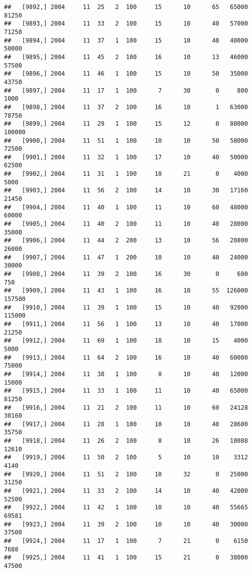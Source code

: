 \documentclass{article}\usepackage[]{graphicx}\usepackage[]{color}
\makeatletter
\newenvironment{kframe}{%
 \def\at@end@of@kframe{}%
 \ifinner\ifhmode%
  \def\at@end@of@kframe{\end{minipage}}%
  \begin{minipage}{\columnwidth}%
 \fi\fi%
 \def\FrameCommand##1{\hskip\@totalleftmargin \hskip-\fboxsep
 \colorbox{shadecolor}{##1}\hskip-\fboxsep
     \hskip-\linewidth \hskip-\@totalleftmargin \hskip\columnwidth}%
 \MakeFramed {\advance\hsize-\width
   \@totalleftmargin\z@ \linewidth\hsize
   \@setminipage}}%
 {\par\unskip\endMakeFramed%
 \at@end@of@kframe}
\newenvironment{knitrout}{}{} %
\makeatother
\begin{document}
\begin{knitrout}
\begin{kframe}
\begin{verbatim}
##   [9892,] 2004     11  25   2  100     15      10      65   65000   81250
##   [9893,] 2004     11  33   2  100     15      10      40   57000   71250
##   [9894,] 2004     11  37   1  100     15      10      40   40000   50000
##   [9895,] 2004     11  45   2  100     16      10      13   46000   57500
##   [9896,] 2004     11  46   1  100     15      10      50   35000   43750
##   [9897,] 2004     11  17   1  100      7      30       0     800    1000
##   [9898,] 2004     11  37   2  100     16      10       1   63000   78750
##   [9899,] 2004     11  29   1  100     15      12       0   80000  100000
##   [9900,] 2004     11  51   1  100     10      10      50   58000   72500
##   [9901,] 2004     11  32   1  100     17      10      40   50000   62500
##   [9902,] 2004     11  31   1  100     10      21       0    4000    5000
##   [9903,] 2004     11  56   2  100     14      10      30   17160   21450
##   [9904,] 2004     11  40   1  100     11      10      60   48000   60000
##   [9905,] 2004     11  40   2  100     11      10      40   28000   35000
##   [9906,] 2004     11  44   2  200     13      10      56   20800   26000
##   [9907,] 2004     11  47   1  200     10      10      40   24000   30000
##   [9908,] 2004     11  39   2  100     16      30       0     600     750
##   [9909,] 2004     11  43   1  100     16      10      55  126000  157500
##   [9910,] 2004     11  39   1  100     15      10      40   92000  115000
##   [9911,] 2004     11  56   1  100     13      10      40   17000   21250
##   [9912,] 2004     11  69   1  100     18      10      15    4000    5000
##   [9913,] 2004     11  64   2  100     16      10      40   60000   75000
##   [9914,] 2004     11  38   1  100      8      10      40   12000   15000
##   [9915,] 2004     11  33   1  100     11      10      40   65000   81250
##   [9916,] 2004     11  21   2  100     11      10      60   24128   30160
##   [9917,] 2004     11  28   1  100     10      10      40   28600   35750
##   [9918,] 2004     11  26   2  100      8      10      26   10088   12610
##   [9919,] 2004     11  50   2  100      5      10      10    3312    4140
##   [9920,] 2004     11  51   2  100     10      32       0   25000   31250
##   [9921,] 2004     11  33   2  100     14      10      40   42000   52500
##   [9922,] 2004     11  42   1  100     10      10      40   55665   69581
##   [9923,] 2004     11  39   2  100     10      10      40   30000   37500
##   [9924,] 2004     11  17   1  100      7      21       0    6150    7688
##   [9925,] 2004     11  41   1  100     15      21       0   38000   47500

\end{verbatim}
\end{kframe}
\end{knitrout}
\end{document}
